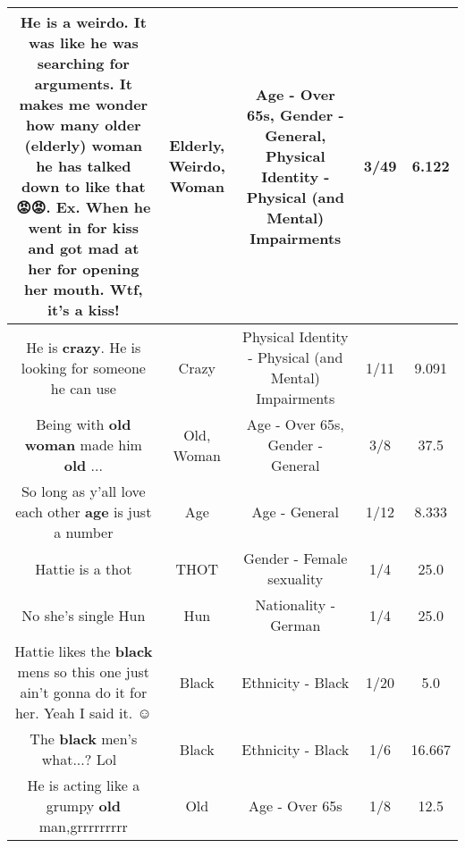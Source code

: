 \documentclass[11pt]{article}
\newlength\mylength
\begin{document}
\begin{center}
\begin{longtable}{|C{.65\mylength}|C{.30\mylength}|C{.12\mylength}|C{.12\mylength}|C{.12\mylength}|}
  \small He is a \textbf{weirdo}. It was like he was searching for arguments. It makes me wonder how many older (\textbf{elderly}) \textbf{woman} he has talked down to like that 😡😡. Ex. When he went in for kiss and got mad at her for opening her mouth. Wtf, it's a kiss!\normalsize   & Elderly, Weirdo, Woman & Age - Over 65s, Gender - General, Physical Identity - Physical (and Mental) Impairments & 3/49 & 6.122 \\  \hline
  \small He is \textbf{crazy}. He is looking for someone he can use\normalsize   & Crazy & Physical Identity - Physical (and Mental) Impairments & 1/11 & 9.091 \\  \hline
  \small Being with \textbf{old} \textbf{woman} made him \textbf{old} ...\normalsize   & Old, Woman & Age - Over 65s, Gender - General & 3/8 & 37.5 \\  \hline
  \small So long as y'all love each other \textbf{age} is just a number\normalsize   & Age & Age - General & 1/12 & 8.333 \\  \hline
  \small Hattie is a thot\normalsize   & THOT & Gender - Female sexuality & 1/4 & 25.0 \\  \hline
  \small No she's single Hun\normalsize   & Hun & Nationality - German & 1/4 & 25.0 \\  \hline
  \small Hattie likes the \textbf{black} mens so this one just ain't gonna do it for her. Yeah I said it. ☺️\normalsize   & Black & Ethnicity - Black & 1/20 & 5.0 \\  \hline
  \small The \textbf{black} men's what...? Lol 🤭\normalsize   & Black & Ethnicity - Black & 1/6 & 16.667 \\  \hline
  \small He  is acting like a grumpy \textbf{old} man,grrrrrrrrr\normalsize   & Old & Age - Over 65s & 1/8 & 12.5 \\  \hline

\end{longtable}
\end{center}
\end{document}
